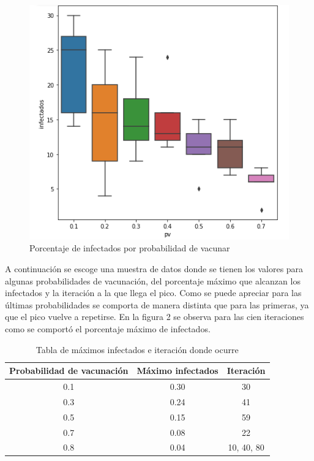 \documentclass{article}
\begin{document}
\begin{figure}[H]
	\centering
	
	\includegraphics[scale=0.6]{MaxInf.png}
	\caption{Porcentaje de infectados por probabilidad de vacunar}
	\label{fig:f1}
\end{figure}

A continuación se escoge una muestra de datos donde se tienen los valores para algunas probabilidades de vacunación, del porcentaje máximo que alcanzan los infectados y la iteración a la que llega el pico. Como se puede apreciar para las últimas probabilidades se comporta de manera distinta que para las primeras, ya que el pico vuelve a repetirse. En la figura 2 se observa para las cien iteraciones como se comportó el porcentaje máximo de infectados.
\begin{table}[H]
\centering
\caption{Tabla de máximos infectados e iteración donde ocurre }

\begin{tabular}{|c|c|c|}
	\hline
	Probabilidad de vacunación & Máximo infectados & Iteración \\
	\hline
		0.1 & 0.30 & 30 \\
	\hline
	0.3 & 0.24 & 41 \\
	\hline
	0.5 & 0.15 & 59 \\
	\hline
	0.7 & 0.08 & 22 \\
	\hline
	0.8 & 0.04 & 10, 40, 80 \\
	\hline
\end{tabular}
\end{table}
\end{document}
